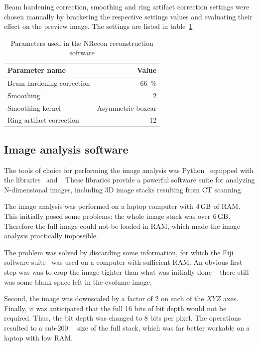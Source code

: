 \documentclass[a4paper,twoside,12pt]{article}
\begin{document}
Beam hardening correction, smoothing and ring artifact correction settings were chosen manually by bracketing the respective settings values and evaluating their effect on the preview image. The settings are listed in table~\ref{table:nrecon_settings}
\begin{table}
    \centering
    \caption{Parameters used in the NRecon reconstruction software}
    \label{table:nrecon_settings}
    \begin{tabular}{lr}
        \toprule
        Parameter name & Value \\
        \midrule
        Beam hardening correction & \SI{66}{\percent} \\
        Smoothing & 2 \\
        Smoothing kernel & Asymmetric boxcar \\
        Ring artifact correction & 12 \\
        \bottomrule
    \end{tabular}
\end{table}

\subsection{Image analysis software}
The tools of choice for performing the image analysis was Python~\cite{python} equipped with the libraries~\cite{skimage} and~\cite{scipy}. These libraries provide a powerful software suite for analyzing N-dimensional images, including 3D image stacks resulting from CT scanning.

The image analysis was performed on a laptop computer with $\SI{4}{\giga\byte}$ of RAM. This initially posed some problems: the whole image stack was over $\SI{6}{\giga\byte}$. Therefore the full image could not be loaded in RAM, which made the image analysis practically impossible.

The problem was solved by discarding some information, for which the Fiji software suite~\cite{fiji} was used on a computer with sufficient RAM. An obvious first step was was to crop the image tighter than what was initially done -- there still was some blank space left in the cvolume image.

Second, the image was downscaled by a factor of 2 on each of the $XYZ$ axes. Finally, it was anticipated that the full 16 bits of bit depth would not be required. Thus, the bit depth was changed to 8 bits per pixel. The operations resulted to a sub-\SI{200}{\mega\byte} size of the full stack, which was far better workable on a laptop with low RAM.
\end{document}
